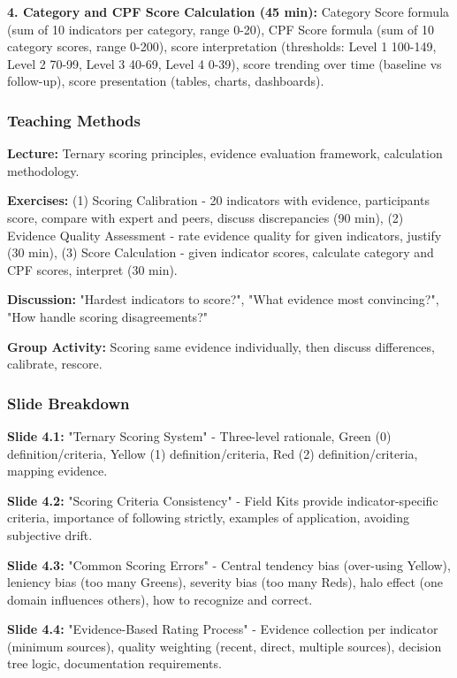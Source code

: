 \documentclass[11pt,a4paper]{article}
\begin{document}
\textbf{4. Category and CPF Score Calculation (45 min):} Category Score formula (sum of 10 indicators per category, range 0-20), CPF Score formula (sum of 10 category scores, range 0-200), score interpretation (thresholds: Level 1 100-149, Level 2 70-99, Level 3 40-69, Level 4 0-39), score trending over time (baseline vs follow-up), score presentation (tables, charts, dashboards).

\subsubsection{Teaching Methods}

\textbf{Lecture:} Ternary scoring principles, evidence evaluation framework, calculation methodology.

\textbf{Exercises:} (1) Scoring Calibration - 20 indicators with evidence, participants score, compare with expert and peers, discuss discrepancies (90 min), (2) Evidence Quality Assessment - rate evidence quality for given indicators, justify (30 min), (3) Score Calculation - given indicator scores, calculate category and CPF scores, interpret (30 min).

\textbf{Discussion:} "Hardest indicators to score?", "What evidence most convincing?", "How handle scoring disagreements?"

\textbf{Group Activity:} Scoring same evidence individually, then discuss differences, calibrate, rescore.

\subsubsection{Slide Breakdown}

\textbf{Slide 4.1:} "Ternary Scoring System" - Three-level rationale, Green (0) definition/criteria, Yellow (1) definition/criteria, Red (2) definition/criteria, mapping evidence.

\textbf{Slide 4.2:} "Scoring Criteria Consistency" - Field Kits provide indicator-specific criteria, importance of following strictly, examples of application, avoiding subjective drift.

\textbf{Slide 4.3:} "Common Scoring Errors" - Central tendency bias (over-using Yellow), leniency bias (too many Greens), severity bias (too many Reds), halo effect (one domain influences others), how to recognize and correct.

\textbf{Slide 4.4:} "Evidence-Based Rating Process" - Evidence collection per indicator (minimum sources), quality weighting (recent, direct, multiple sources), decision tree logic, documentation requirements.
\end{document}
